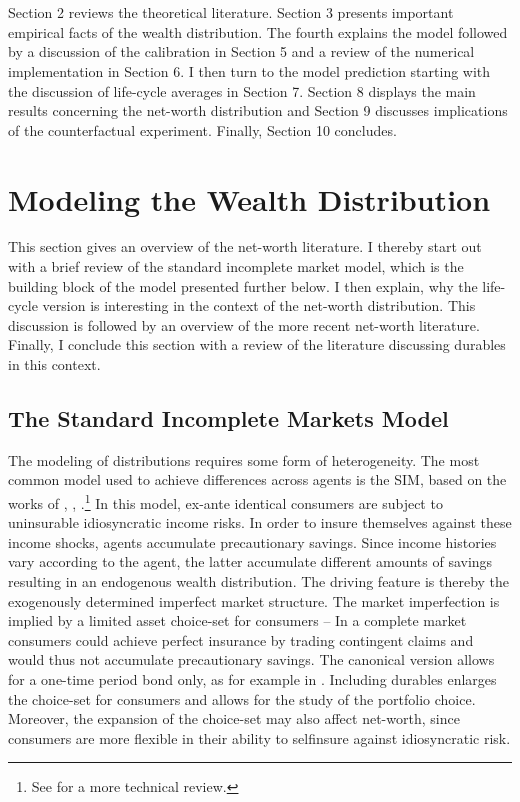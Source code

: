 \documentclass[a4paper,12pt,legno]{article}
\begin{document}
\\ \\
Section 2 reviews the theoretical literature. Section 3 presents important empirical facts of the wealth distribution. The fourth  explains the model followed by a discussion of the calibration in Section 5 and a review of the numerical implementation in Section 6. I then turn to the model prediction starting with the discussion of life-cycle averages in Section 7. Section 8 displays the main results concerning the net-worth distribution and Section 9 discusses implications of the counterfactual experiment. Finally, Section 10 concludes. 


\section{Modeling the Wealth Distribution}
This section gives an overview of the net-worth literature. I thereby start out with a brief review of the standard incomplete market model, which is the building block of the model presented further below. I then explain, why the life-cycle version is interesting in the context of the net-worth distribution. This discussion is followed by an overview of the more recent net-worth literature. Finally, I conclude this section with a review of the literature discussing durables in this context. 

\label{Modeling the wealth distribution}
\subsection{The Standard Incomplete Markets Model}
The modeling of distributions requires some form of heterogeneity. The most common model used to achieve differences across agents is the SIM, based on the works of \cite{bewley1977permanent}, \cite{aiyagari1994}, \cite{huggett1993risk}.\footnote{See \cite{ljungqvist2012recursive} for a more technical review.} In this model, ex-ante identical consumers are subject to uninsurable idiosyncratic income risks. In order to insure themselves against these income shocks, agents accumulate precautionary savings. Since income histories vary according to the agent, the latter accumulate different amounts of savings resulting in an endogenous wealth distribution. The driving feature is thereby the exogenously determined imperfect market structure. The market imperfection is implied by a limited asset choice-set for consumers \--- In a complete market consumers could achieve perfect insurance by trading contingent claims and would thus not accumulate precautionary savings. The canonical version allows for a one-time period bond only, as for example in \cite{hintermaier2011}. Including durables enlarges the choice-set for consumers and allows for the study of the portfolio choice. Moreover, the expansion of the choice-set may also affect net-worth, since consumers are more flexible in their ability to selfinsure against idiosyncratic risk.  
\end{document}
